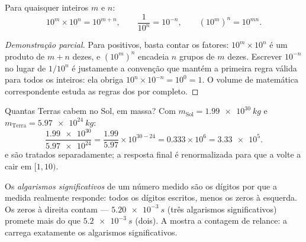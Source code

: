 \begin{proposition}\label{prop:g10:orders-of-magnitude:powers}
Para quaisquer inteiros $m$ e $n$:
\[
10^{m} \times 10^{n} = 10^{m+n}, \qquad
\frac{1}{10^{n}} = 10^{-n}, \qquad
\left(10^{m}\right)^{n} = 10^{mn}.
\]
\end{proposition}

\begin{proof}[Demonstração parcial]
Para  positivos, basta contar os fatores: $10^{m} \times 10^{n}$
é um produto de $m + n$ dezes, e $(10^m)^n$ encadeia $n$ grupos de $m$
dezes. Escrever $10^{-n}$ no lugar de $1/10^{n}$ é justamente a convenção
que mantém a primeira regra válida para todos os inteiros: ela obriga
$10^{n} \times 10^{-n} = 10^{0} = 1$. O volume de matemática
correspondente estuda as regras dos  por completo.
\end{proof}

\begin{example}\label{ex:g10:orders-of-magnitude:scinot}
Quantas Terras cabem no Sol, em massa? Com
$m_{\text{Sol}} = \qty{1.99e30}{kg}$ e
$m_{\text{Terra}} = \qty{5.97e24}{kg}$:
\[
\frac{\num{1.99e30}}{\num{5.97e24}}
= \frac{1.99}{5.97} \times 10^{30-24}
= 0.333 \times 10^{6}
= \num{3.33e5}.
\]
 e  são tratados separadamente; a resposta final é
renormalizada para que a  volte a cair em $[1, 10)$.
\end{example}

\begin{definition}\label{def:g10:orders-of-magnitude:sigfig}
Os \emph{algarismos significativos} de
um número medido são os dígitos por que a medida realmente responde:
todos os dígitos escritos, menos os zeros à esquerda. Os zeros à direita
contam --- $\qty{5.20e-3}{s}$ (três algarismos significativos) promete
mais do que $\qty{5.2e-3}{s}$ (dois). A  mostra a
contagem de relance: a  carrega exatamente os algarismos
significativos.
\end{definition}

